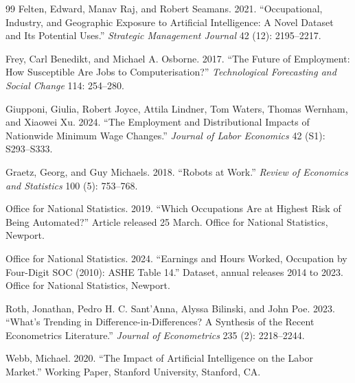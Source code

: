 \documentclass[12pt,leqno]{article}
\renewcommand{\thesection}{\Roman{section}}
\begin{document}
\begin{thebibliography}{99}
Felten, Edward, Manav Raj, and Robert Seamans. 2021. ``Occupational, Industry, and Geographic Exposure to Artificial Intelligence: A Novel Dataset and Its Potential Uses.'' \emph{Strategic Management Journal} 42 (12): 2195--2217.

Frey, Carl Benedikt, and Michael A. Osborne. 2017. ``The Future of Employment: How Susceptible Are Jobs to Computerisation?'' \emph{Technological Forecasting and Social Change} 114: 254--280.

Giupponi, Giulia, Robert Joyce, Attila Lindner, Tom Waters, Thomas Wernham, and Xiaowei Xu. 2024. ``The Employment and Distributional Impacts of Nationwide Minimum Wage Changes.'' \emph{Journal of Labor Economics} 42 (S1): S293--S333.

Graetz, Georg, and Guy Michaels. 2018. ``Robots at Work.'' \emph{Review of Economics and Statistics} 100 (5): 753--768.

Office for National Statistics. 2019. ``Which Occupations Are at Highest Risk of Being Automated?'' Article released 25 March. Office for National Statistics, Newport.

Office for National Statistics. 2024. ``Earnings and Hours Worked, Occupation by Four-Digit SOC (2010): ASHE Table 14.'' Dataset, annual releases 2014 to 2023. Office for National Statistics, Newport.

Roth, Jonathan, Pedro H. C. Sant'Anna, Alyssa Bilinski, and John Poe. 2023. ``What's Trending in Difference-in-Differences? A Synthesis of the Recent Econometrics Literature.'' \emph{Journal of Econometrics} 235 (2): 2218--2244.

Webb, Michael. 2020. ``The Impact of Artificial Intelligence on the Labor Market.'' Working Paper, Stanford University, Stanford, CA.

\end{thebibliography}

\clearpage
\appendix
\renewcommand{\thesection}{\Alph{section}}
\renewcommand{\theequation}{\thesection\arabic{equation}}
\renewcommand{\thetable}{\thesection\arabic{table}}
\renewcommand{\thefigure}{\thesection\arabic{figure}}
\end{document}
